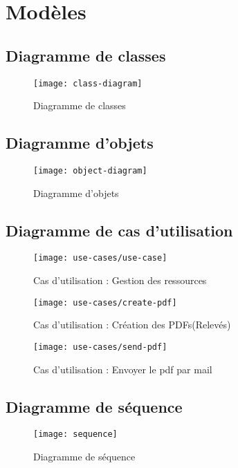 \section{Modèles}\label{sec: conception-database-models}
\subsection{Diagramme de classes}\label{subsec:conception-class-diagram}
\begin{figure}[ht]
    \centering
    \caption{Diagramme de classes}
    \texttt{[image: class-diagram]}
    \label{fig:class-diagram}
\end{figure}
\pagebreak

\subsection{Diagramme d'objets}\label{subsec:conception-object-diagram}
\begin{figure}[ht]
    \centering
    \caption{Diagramme d'objets}
    \texttt{[image: object-diagram]}
    \label{fig:object-diagram}
\end{figure}
\pagebreak


\subsection{Diagramme de cas d'utilisation}\label{subsec:conception-use-case-diagram}
\begin{figure}[ht]
    \caption{Cas d'utilisation : Gestion des ressources}
    \texttt{[image: use-cases/use-case]}
    \centering
    \label{fig:ress-management}
\end{figure}

\begin{figure}[ht]
    \caption{Cas d'utilisation : Création des PDFs(Relevés)}
    \texttt{[image: use-cases/create-pdf]}
    \centering
    \label{fig:create-pdf}
\end{figure}
\pagebreak

\begin{figure}[ht]
    \caption{Cas d'utilisation : Envoyer le pdf par mail}
    \texttt{[image: use-cases/send-pdf]}
    \centering
    \label{fig:send-pdf}
\end{figure}
\pagebreak

\subsection{Diagramme de séquence}\label{subsec:conception-sequence-diagram}
\begin{figure}[ht]
    \centering
    \caption{Diagramme de séquence}
    \texttt{[image: sequence]}
    \label{fig:sequence-diagram}
\end{figure}
\pagebreak